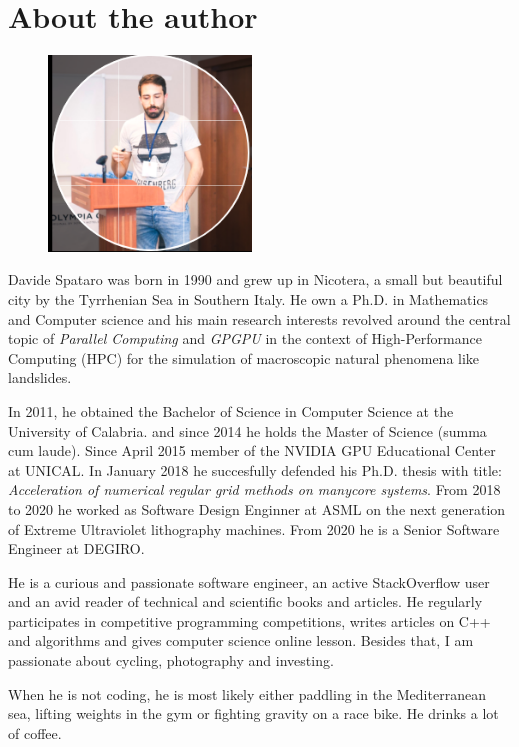 \chapter*{About the author}

\begin{figure}
    \vspace{-20pt}
    \begin{center}
        \includegraphics[width=0.48\textwidth]{images/me_linkedin}
    \end{center}
    \vspace{-15pt}
  \end{figure}

Davide Spataro was born in 1990 and grew up in Nicotera, a small but beautiful city by the Tyrrhenian Sea in Southern Italy. 
He own a Ph.D. in Mathematics and Computer science and his main research interests revolved around the central topic of \textit{Parallel Computing} and \textit{GPGPU} in the context of High-Performance Computing (HPC) for the simulation of macroscopic natural phenomena like landslides. 

In 2011, he obtained the Bachelor of Science in Computer Science at the University of Calabria. and since 2014 he holds the Master of Science (summa cum laude).
Since April 2015 member of the NVIDIA GPU Educational Center at UNICAL.
In  January 2018 he succesfully defended his Ph.D. thesis with title: \textit{Acceleration of numerical regular grid methods on manycore systems}. From 2018 to 2020 he worked as Software Design Enginner at ASML on the next generation of Extreme Ultraviolet lithography machines.
From 2020 he is a Senior Software Engineer at DEGIRO. 


He is a curious and passionate software engineer, an active StackOverflow user and an avid reader of technical and scientific books and articles.
He regularly participates in competitive programming competitions, writes articles on C++ and algorithms and gives computer science online lesson. 
Besides that, I am passionate about
cycling, photography and investing.

When he is  not coding, he is most likely either
paddling in the Mediterranean sea,
lifting weights in the gym or fighting
gravity on a race bike. 
He drinks a lot of
coffee. 
